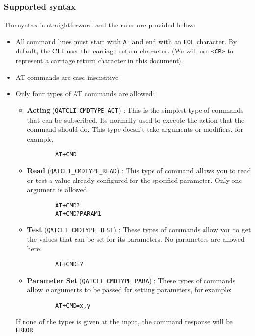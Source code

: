 \subsubsection{Supported syntax} \label{atsyntax}

The syntax is straightforward and the rules are provided below:

\begin{itemize}
    \item All command lines must start with \lstinline{AT} and end with an \lstinline{EOL} character. By default, the CLI uses the carriage return character. (We will use \lstinline{<CR>} to represent a carriage return character in this document).
    \item AT commands are case-insensitive 
    \item Only four types of AT commands are allowed:
    \begin{itemize}
        \item \textbf{Acting} (\lstinline{QATCLI_CMDTYPE_ACT}) : This is the simplest type of commands that can be subscribed. Its normally used to execute the action that the command should do. This type doesn't take arguments or modifiers, for example,
        \begin{lstlisting}
        AT+CMD
        \end{lstlisting}
        \item \textbf{Read} (\lstinline{QATCLI_CMDTYPE_READ}) : This type of command allows you to read or test a value already configured for the specified parameter. Only one argument is allowed.
        \begin{lstlisting}
        AT+CMD?
        AT+CMD?PARAM1
        \end{lstlisting}        
        \item \textbf{Test} (\lstinline{QATCLI_CMDTYPE_TEST}) : These types of commands allow you to get the values that can be set for its parameters. No parameters are allowed here.
        \begin{lstlisting}
        AT+CMD=?
        \end{lstlisting}
        \item \textbf{Parameter Set} (\lstinline{QATCLI_CMDTYPE_PARA}) : These types of commands allow \textit{n} arguments to be passed for setting parameters, for example:
        \begin{lstlisting}
        AT+CMD=x,y
        \end{lstlisting}
    \end{itemize}
    If none of the types is given at the input, the command response will be \lstinline{ERROR}

\end{itemize}
